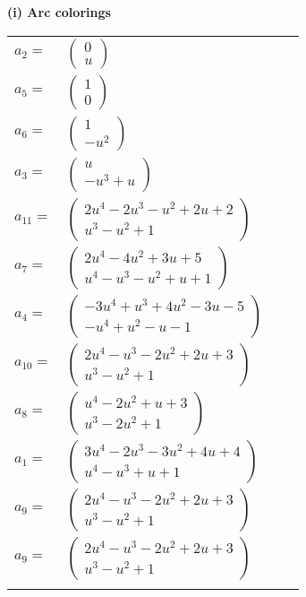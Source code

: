 \documentclass[1p]{elsarticle_modified}
\theoremstyle{definition}
\begin{document}
\flushleft \textbf{(i) Arc colorings}\\
\begin{tabular}{m{7pt} m{180pt} m{7pt} m{180pt} }
\flushright $a_{2}=$&$\begin{pmatrix}0\\u\end{pmatrix}$ \\
\flushright $a_{5}=$&$\begin{pmatrix}1\\0\end{pmatrix}$ \\
\flushright $a_{6}=$&$\begin{pmatrix}1\\- u^2\end{pmatrix}$ \\
\flushright $a_{3}=$&$\begin{pmatrix}u\\- u^3+u\end{pmatrix}$ \\
\flushright $a_{11}=$&$\begin{pmatrix}2 u^4-2 u^3- u^2+2 u+2\\u^3- u^2+1\end{pmatrix}$ \\
\flushright $a_{7}=$&$\begin{pmatrix}2 u^4-4 u^2+3 u+5\\u^4- u^3- u^2+u+1\end{pmatrix}$ \\
\flushright $a_{4}=$&$\begin{pmatrix}-3 u^4+u^3+4 u^2-3 u-5\\- u^4+u^2- u-1\end{pmatrix}$ \\
\flushright $a_{10}=$&$\begin{pmatrix}2 u^4- u^3-2 u^2+2 u+3\\u^3- u^2+1\end{pmatrix}$ \\
\flushright $a_{8}=$&$\begin{pmatrix}u^4-2 u^2+u+3\\u^3-2 u^2+1\end{pmatrix}$ \\
\flushright $a_{1}=$&$\begin{pmatrix}3 u^4-2 u^3-3 u^2+4 u+4\\u^4- u^3+u+1\end{pmatrix}$ \\
\flushright $a_{9}=$&$\begin{pmatrix}2 u^4- u^3-2 u^2+2 u+3\\u^3- u^2+1\end{pmatrix}$\\ \flushright $a_{9}=$&$\begin{pmatrix}2 u^4- u^3-2 u^2+2 u+3\\u^3- u^2+1\end{pmatrix}$\\&\end{tabular}
\end{document}
